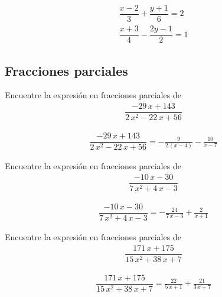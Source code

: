 \begin{problema}
	\begin{align*}
		\dfrac{x-2}{3}+\dfrac{y+1}{6}=2\\
		\dfrac{x+3}{4}-\dfrac{2y-1}{2}=1
	\end{align*}

\end{problema}



\subsection*{Fracciones parciales}

{}
\begin{problema}
	Encuentre la expresión en fracciones parciales de
	\begin{align*}
		\dfrac{-29 \, x + 143}{2 \, x^{2} - 22 \, x + 56}
	\end{align*}
\end{problema}

\begin{align*}
	\dfrac{-29 \, x + 143}{2 \, x^{2} - 22 \, x + 56}= -\frac{9}{2 \, {\left(x - 4\right)}} - \frac{10}{x - 7}
\end{align*}


{}
\begin{problema}
	Encuentre la expresión en fracciones parciales de
	\begin{align*}
		\dfrac{-10 \, x - 30}{7 \, x^{2} + 4 \, x - 3}
	\end{align*}
\end{problema}

\begin{align*}
	\dfrac{-10 \, x - 30}{7 \, x^{2} + 4 \, x - 3}= -\frac{24}{7 \, x - 3} + \frac{2}{x + 1}
\end{align*}


{}
\begin{problema}
	Encuentre la expresión en fracciones parciales de
	\begin{align*}
		\dfrac{171 \, x + 175}{15 \, x^{2} + 38 \, x + 7}
	\end{align*}
\end{problema}

\begin{align*}
	\dfrac{171 \, x + 175}{15 \, x^{2} + 38 \, x + 7}= \frac{22}{5 \, x + 1} + \frac{21}{3 \, x + 7}
\end{align*}


